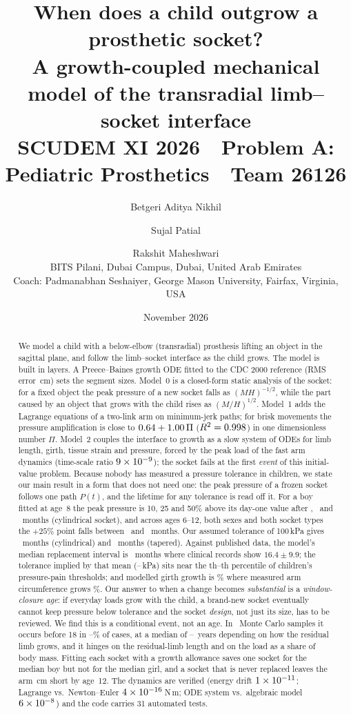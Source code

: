 \documentclass[11pt]{article}
\title{\textbf{When does a child outgrow a prosthetic socket?}\\[2pt]
\large A growth-coupled mechanical model of the transradial limb--socket interface\\[4pt]
\normalsize SCUDEM XI 2026 \,\textbullet\, Problem A: Pediatric Prosthetics \,\textbullet\, Team 26126}
\author{Betgeri Aditya Nikhil \and Sujal Patial \and Rakshit Maheshwari\\[2pt]
\small BITS Pilani, Dubai Campus, Dubai, United Arab Emirates\\[4pt]
\small Coach: Padmanabhan Seshaiyer, George Mason University, Fairfax, Virginia, USA}
\date{November 2026}
\begin{document}
\maketitle

\begin{abstract}
We model a child with a below-elbow (transradial) prosthesis lifting an object in the sagittal plane, and follow the limb--socket interface as the child grows. The model is built in layers. A Preece--Baines growth ODE fitted to the CDC 2000 reference (RMS error \pbRmseBoy\,cm) sets the segment sizes. Model~0 is a closed-form static analysis of the socket: for a fixed object the peak pressure of a new socket falls as $(MH)^{-1/2}$, while the part caused by an object that grows with the child rises as $(M/H)^{1/2}$. Model~1 adds the Lagrange equations of a two-link arm on minimum-jerk paths; for brisk movements the pressure amplification is close to $0.64 + 1.00\,\Pi$ ($R^2=0.998$) in one dimensionless number $\Pi$. Model~2 couples the interface to growth as a slow system of ODEs for limb length, girth, tissue strain and pressure, forced by the peak load of the fast arm dynamics (time-scale ratio $9\times10^{-9}$); the socket fails at the first \emph{event} of this initial-value problem. Because nobody has measured a pressure tolerance in children, we state our main result in a form that does not need one: the peak pressure of a frozen socket follows one path $P(t)$, and the lifetime for any tolerance is read off it. For a boy fitted at age~8 the peak pressure is 10, 25 and 50\% above its day-one value after \tTenBoyCyl, \tPlusBoyCyl\ and \tFiftyBoyCyl\ months (cylindrical socket), and across ages 6--12, both sexes and both socket types the $+25\%$ point falls between \tPlusMin\ and \tPlusMax\ months. Our assumed tolerance of 100\,kPa gives \lifeCyl\ months (cylindrical) and \lifeTap\ months (tapered). Against published data, the model's median replacement interval is \mcMedStd\ months where clinical records show $16.4\pm9.9$; the tolerance implied by that mean (\impliedCyl--\impliedTap\,kPa) sits near the \impPctCyl th--\impPctTap th percentile of children's pressure-pain thresholds; and modelled girth growth is \girthBoyModel\% where measured arm circumference grows \girthBoyMuac\%. Our answer to when a change becomes \emph{substantial} is a \emph{window-closure age}: if everyday loads grow with the child, a brand-new socket eventually cannot keep pressure below tolerance and the socket \emph{design}, not just its size, has to be reviewed. We find this is a conditional event, not an age. In \cloMcN\ Monte Carlo samples it occurs before 18 in \cloAclosed--\cloBclosed\% of cases, at a median of \cloBmed--\cloAmed\ years depending on how the residual limb grows, and it hinges on the residual-limb length and on the load as a share of body mass. Fitting each socket with a growth allowance saves one socket for the median boy but not for the median girl, and a socket that is never replaced leaves the arm \,cm short by age~12. The dynamics are verified (energy drift $1\times10^{-11}$; Lagrange vs.\ Newton--Euler $4\times10^{-16}$\,N\,m; ODE system vs.\ algebraic model $6\times10^{-8}$) and the code carries 31 automated tests.
\end{abstract}
\end{document}

